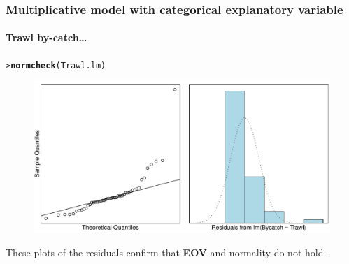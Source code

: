 \documentclass{beamer}\usepackage[]{graphicx}\usepackage[]{xcolor}
\makeatletter
\newcommand{\hlstd}[1]{\textcolor[rgb]{0.345,0.345,0.345}{#1}}%
\newcommand{\hlkwd}[1]{\textcolor[rgb]{0.737,0.353,0.396}{\textbf{#1}}}%
\newenvironment{kframe}{%
 \def\at@end@of@kframe{}%
 \ifinner\ifhmode%
  \def\at@end@of@kframe{\end{minipage}}%
  \begin{minipage}{\columnwidth}%
 \fi\fi%
 \def\FrameCommand##1{\hskip\@totalleftmargin \hskip-\fboxsep
 \colorbox{shadecolor}{##1}\hskip-\fboxsep
     \hskip-\linewidth \hskip-\@totalleftmargin \hskip\columnwidth}%
 \MakeFramed {\advance\hsize-\width
   \@totalleftmargin\z@ \linewidth\hsize
   \@setminipage}}%
 {\par\unskip\endMakeFramed%
 \at@end@of@kframe}
\newenvironment{knitrout}{}{} %
\makeatother
\begin{document}
\begin{frame}[fragile]
\frametitle{Multiplicative model with categorical explanatory variable}
\framesubtitle{Trawl by-catch\ldots}
\begin{knitrout}\scriptsize
{}\color{fgcolor}\begin{kframe}
\begin{alltt}
\hlstd{> }\hlkwd{normcheck}\hlstd{(Trawl.lm)}
\end{alltt}
\end{kframe}
\end{knitrout}



\begin{figure}
  \centering
  \includegraphics[scale=0.5]{figure/RC-H06-053}
\end{figure}

These plots of the residuals confirm that \textbf{EOV} and normality do not hold.
\end{frame}
\end{document}

